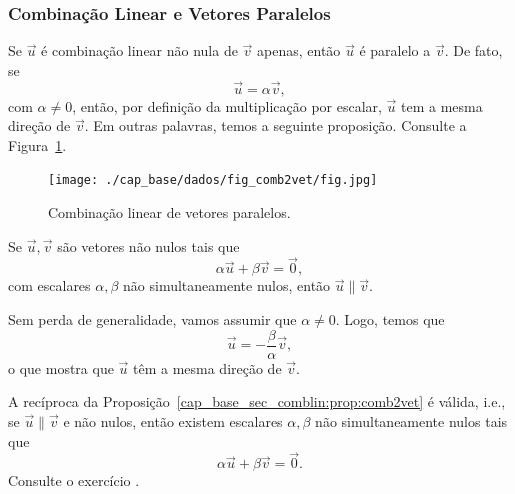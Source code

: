 \subsubsection{Combinação Linear e Vetores Paralelos}

Se $\vec{u}$ é combinação linear não nula de $\vec{v}$ apenas, então $\vec{u}$ é paralelo a $\vec{v}$. De fato, se
\begin{equation}
  \vec{u} = \alpha\vec{v},
\end{equation}
com $\alpha\neq 0$, então, por definição da multiplicação por escalar, $\vec{u}$ tem a mesma direção de $\vec{v}$. Em outras palavras, temos a seguinte proposição. Consulte a Figura~\ref{cap_base_sec_comblin:fig:comb2vet}.

\begin{figure}[h]
  \centering
  \texttt{[image: ./cap\_base/dados/fig\_comb2vet/fig.jpg]}
  \caption{Combinação linear de vetores paralelos.}
  \label{cap_base_sec_comblin:fig:comb2vet}
\end{figure}

\begin{proposicao}\label{cap_base_sec_comblin:prop:comb2vet}
  Se $\vec{u},\vec{v}$ são vetores não nulos tais que
  \begin{equation}
    \alpha\vec{u} + \beta\vec{v} = \vec{0},
  \end{equation}
  com escalares $\alpha,\beta$ não simultaneamente nulos, então $\vec{u}\parallel \vec{v}$.
\end{proposicao}
\begin{demonstracao}
  Sem perda de generalidade, vamos assumir que $\alpha\neq 0$. Logo, temos que
  \begin{equation}
    \vec{u} = -\frac{\beta}{\alpha}\vec{v},
  \end{equation}
  o que mostra que $\vec{u}$ têm a mesma direção de $\vec{v}$.
\end{demonstracao}

\begin{obs}
  A recíproca da Proposição~\ref{cap_base_sec_comblin:prop:comb2vet} é válida, i.e., se $\vec{u}\parallel\vec{v}$ e não nulos, então existem escalares $\alpha,\beta$ não simultaneamente nulos tais que
  \begin{equation}
    \alpha\vec{u} + \beta\vec{v} = \vec{0}.
  \end{equation}
  Consulte o exercício .
\end{obs}

